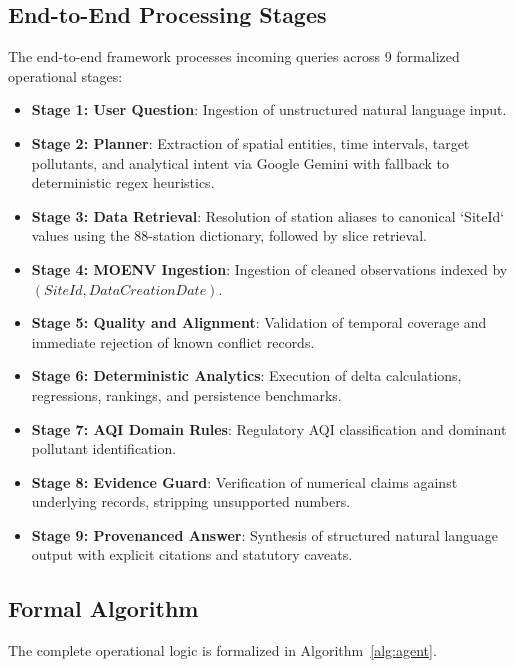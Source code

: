 \documentclass[conference]{IEEEtran}
\begin{document}
\subsection{End-to-End Processing Stages}
The end-to-end framework processes incoming queries across 9 formalized operational stages:
\begin{itemize}
    \item \textbf{Stage 1: User Question}: Ingestion of unstructured natural language input.
    \item \textbf{Stage 2: Planner}: Extraction of spatial entities, time intervals, target pollutants, and analytical intent via Google Gemini with fallback to deterministic regex heuristics.
    \item \textbf{Stage 3: Data Retrieval}: Resolution of station aliases to canonical `SiteId` values using the 88-station dictionary, followed by slice retrieval.
    \item \textbf{Stage 4: MOENV Ingestion}: Ingestion of cleaned observations indexed by $(SiteId, DataCreationDate)$.
    \item \textbf{Stage 5: Quality and Alignment}: Validation of temporal coverage and immediate rejection of known conflict records.
    \item \textbf{Stage 6: Deterministic Analytics}: Execution of delta calculations, regressions, rankings, and persistence benchmarks.
    \item \textbf{Stage 7: AQI Domain Rules}: Regulatory AQI classification and dominant pollutant identification.
    \item \textbf{Stage 8: Evidence Guard}: Verification of numerical claims against underlying records, stripping unsupported numbers.
    \item \textbf{Stage 9: Provenanced Answer}: Synthesis of structured natural language output with explicit citations and statutory caveats.
\end{itemize}

\subsection{Formal Algorithm}
The complete operational logic is formalized in Algorithm~\ref{alg:agent}.
\end{document}
